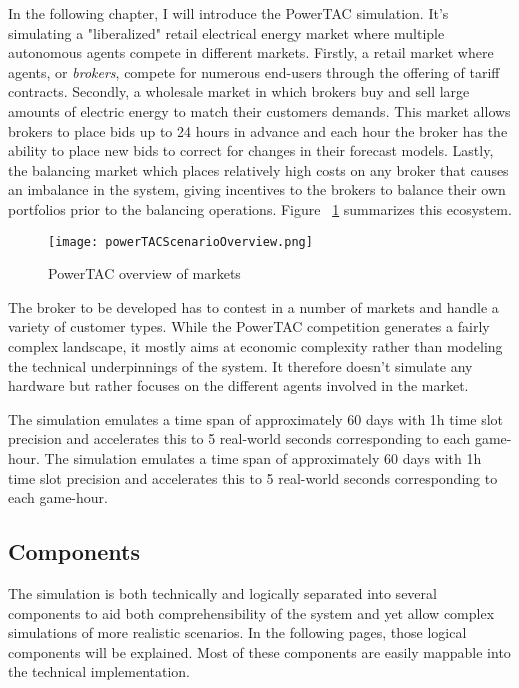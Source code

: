 In the following chapter, I will introduce the \ac{PowerTAC} simulation. It's simulating a "liberalized" retail electrical energy market where multiple autonomous agents compete in different markets. Firstly, a retail market where agents, or \emph{brokers}, compete for numerous end-users through the offering of tariff contracts. Secondly, a wholesale market in which brokers buy and sell large amounts of electric energy to match their customers demands. This market allows brokers to place bids up to 24 hours in advance and each hour the broker has the ability to place new bids to correct for changes in their forecast models. Lastly, the balancing market which places relatively high costs on any broker that causes an imbalance in the system, giving incentives to the brokers to balance their own portfolios prior to the balancing operations. Figure ~\ref{fig:powertacoverview} summarizes this ecosystem.
\begin{figure}[!h]%
    \centering
    \texttt{[image: powerTACScenarioOverview.png]}
	\caption{\ac{PowerTAC} overview of markets}
    \label{fig:powertacoverview}
\end{figure}


The broker to be developed has to contest in a number of markets and handle a variety of customer types. While the \ac{PowerTAC} competition generates a fairly complex landscape, it mostly aims at economic complexity rather than modeling the technical underpinnings of the system. It therefore doesn't simulate any hardware but rather focuses on the different agents involved in the market.

The simulation emulates a time span of approximately 60 days with 1h time slot precision and accelerates this to 5 real-world seconds corresponding to each game-hour. The simulation emulates a time span of approximately 60 days with 1h time slot precision and accelerates this to 5 real-world seconds corresponding to each game-hour.

\subsection{Components}

The simulation is both technically and logically separated into several components to aid both comprehensibility of the system and yet allow complex simulations of more realistic scenarios. In the following pages, those logical components will be explained. Most of these components are easily mappable into the technical implementation.

